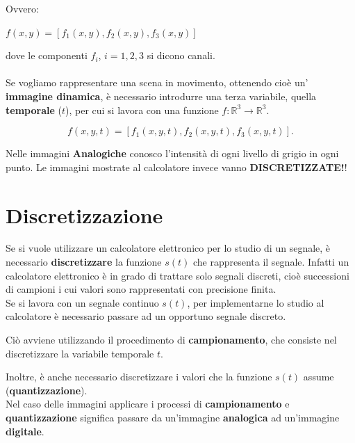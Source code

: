 Ovvero:
\begin{center}
    $f(x,y) = [f_1(x,y), f_2(x,y), f_3(x,y)]$
\end{center}
dove le componenti $f_i$, $i = 1,2,3$ si dicono canali. \\\\Se vogliamo
rappresentare una scena in movimento, ottenendo cioè un' \textbf{immagine
    dinamica}, è necessario introdurre una terza variabile, quella
\textbf{temporale} ($t$), per cui si lavora con una funzione $f: \mathbb{R}^3 \rightarrow
    \mathbb{R}^3$.

$$
    f(x,y,t) = [f_1(x,y,t), f_2(x ,y,t), f_3(x,y,t)].
$$

Nelle immagini \textbf{Analogiche} conosco l'intensità di ogni livello di grigio
in ogni punto. Le immagini mostrate al calcolatore invece vanno
\textbf{DISCRETIZZATE!}!


\section{Discretizzazione}
Se si vuole utilizzare un calcolatore elettronico per lo studio di un segnale, è
necessario \textbf{discretizzare} la funzione $s(t)$ che rappresenta il segnale.
Infatti un calcolatore elettronico è in grado di trattare solo segnali discreti,
cioè successioni di campioni i cui valori sono rappresentati con precisione
finita. \\Se si lavora con un segnale continuo $s(t)$, per implementarne lo
studio al calcolatore è necessario passare ad un opportuno segnale discreto.

\begin{center}
    Ciò avviene utilizzando il procedimento di \textbf{campionamento}, che
    consiste nel discretizzare la variabile temporale $t$.
\end{center}

Inoltre, è anche necessario discretizzare i valori che la funzione $s(t)$ assume
(\textbf{quantizzazione}).\\

Nel caso delle immagini applicare i processi di \textbf{campionamento} e
\textbf{quantizzazione} significa passare da un'immagine \textbf{analogica} ad
un'immagine \textbf{digitale}.

